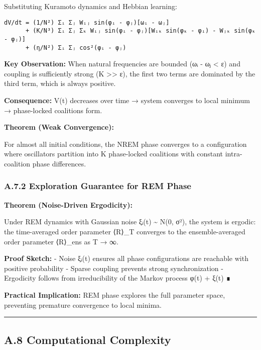 \documentclass[
]{article}
\begin{document}
Substituting Kuramoto dynamics and Hebbian learning:

\begin{verbatim}
dV/dt = (1/N²) Σᵢ Σⱼ Wᵢⱼ sin(φᵢ - φⱼ)[ωᵢ - ωⱼ]
      + (K/N³) Σᵢ Σⱼ Σₖ Wᵢⱼ sin(φᵢ - φⱼ)[Wᵢₖ sin(φₖ - φᵢ) - Wⱼₖ sin(φₖ - φⱼ)]
      + (η/N²) Σᵢ Σⱼ cos²(φᵢ - φⱼ)
\end{verbatim}

\textbf{Key Observation:} When natural frequencies are bounded
(\textbar ωᵢ - ωⱼ\textbar{} \textless{} ε) and coupling is sufficiently
strong (K \textgreater\textgreater{} ε), the first two terms are
dominated by the third term, which is always positive.

\textbf{Consequence:} V(t) decreases over time → system converges to
local minimum → phase-locked coalitions form.

\textbf{Theorem (Weak Convergence):}

For almost all initial conditions, the NREM phase converges to a
configuration where oscillators partition into K phase-locked coalitions
with constant intra-coalition phase differences.

\subsubsection{A.7.2 Exploration Guarantee for REM
Phase}\label{a.7.2-exploration-guarantee-for-rem-phase}

\textbf{Theorem (Noise-Driven Ergodicity):}

Under REM dynamics with Gaussian noise ξᵢ(t) \textasciitilde{} N(0, σ²),
the system is ergodic: the time-averaged order parameter ⟨R⟩\_T
converges to the ensemble-averaged order parameter ⟨R⟩\_ens as T → ∞.

\textbf{Proof Sketch:} - Noise ξᵢ(t) ensures all phase configurations
are reachable with positive probability - Sparse coupling prevents
strong synchronization - Ergodicity follows from irreducibility of the
Markov process φ(t) + ξ(t) ∎

\textbf{Practical Implication:} REM phase explores the full parameter
space, preventing premature convergence to local minima.

\begin{center}\rule{0.5\linewidth}{0.5pt}\end{center}

\subsection{A.8 Computational
Complexity}\label{a.8-computational-complexity}
\end{document}
